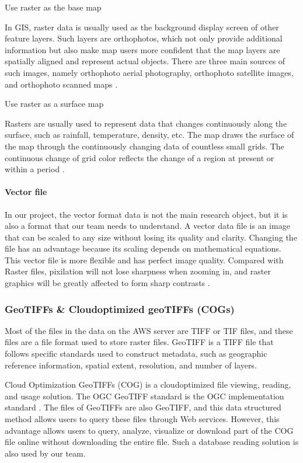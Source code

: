 \documentclass[conference]{IEEEtran}
\newcommand{\subparagraph}{}
\begin{document}
\subparagraph{Use raster as the base map}

In GIS, raster data is usually used as the background display screen of other feature layers. Such layers are orthophotos, 
which not only provide additional information but also make map users more confident that the map layers are spatially 
aligned and represent actual objects. There are three main sources of such images, namely orthophoto aerial photography, 
orthophoto satellite images, and orthophoto scanned maps \cite{decsktop15:online}.

\subparagraph{Use raster as a surface map}

Rasters are usually used to represent data that changes continuously along the surface, such as rainfall, temperature, 
density, etc. The map draws the surface of the map through the continuously changing data of countless small grids. The 
continuous change of grid color reflects the change of a region at present or within a period \cite{decsktop15:online}.

\paragraph{Vector file}

In our project, the vector format data is not the main research object, but it is also a format that our team needs 
to understand. A vector data file is an image that can be scaled to any size without losing its quality and clarity. 
Changing the file has an advantage because its scaling depends on mathematical equations. This vector file is more 
flexible and has perfect image quality. Compared with Raster files, pixilation will not lose sharpness when zooming 
in, and raster graphics will be greatly affected to form sharp contrasts \cite{Thepaged34:online}.


\subsubsection{GeoTIFFs \& Cloud\-optimized geoTIFFs (COGs)}

Most of the files in the data on the AWS server are TIFF or TIF files, and these files are a file format used to 
store raster files. GeoTIFF is a TIFF file that follows specific standards used to construct metadata, such as geographic 
reference information, spatial extent, resolution, and number of layers.

Cloud Optimization GeoTIFFs (COG) is a cloud\-optimized file viewing, reading, and usage solution. The OGC GeoTIFF standard 
is the OGC implementation standard \cite{NASA23:online}. The files of GeoTIFFs are also GeoTIFF, and this data structured 
method allows users to query these files through Web services. However, this advantage allows users to query, analyze, visualize 
or download part of the COG file online without downloading the entire file. Such a database reading solution is also used by our team.
\end{document}
